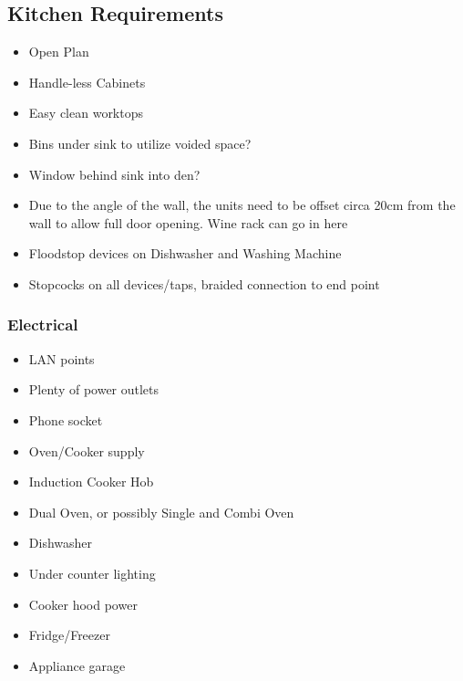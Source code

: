 \subsection{Kitchen Requirements}
\begin{itemize}
\item Open Plan
\item Handle-less Cabinets
\item Easy clean worktops
\item Bins under sink to utilize voided space?
\item Window behind sink into den?
\item Due to the angle of the wall, the units need to be offset circa 20cm from the wall to allow full door opening. Wine rack can go in here
\item Floodstop devices on Dishwasher and Washing Machine 
\item Stopcocks on all devices/taps, braided connection to end point 
\end{itemize}

\subsubsection{Electrical}
\begin{itemize}
\item LAN points
\item Plenty of power outlets
\item Phone socket
\item Oven/Cooker supply
\item Induction Cooker Hob
\item Dual Oven, or possibly Single and Combi Oven
\item Dishwasher
\item Under counter lighting
\item Cooker hood power
\item Fridge/Freezer
\item Appliance garage
\end{itemize}
